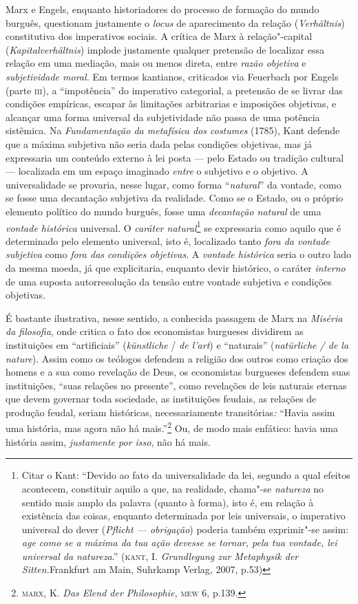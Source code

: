 Marx e Engels, enquanto historiadores do processo de formação do mundo
burguês, questionam justamente o \emph{locus} de aparecimento da relação
(\emph{Verhältnis}) constitutiva dos imperativos sociais. A crítica de
Marx à relação"-capital (\emph{Kapitalverhältnis}) implode justamente
qualquer pretensão de localizar essa relação em uma mediação, mais ou
menos direta, entre \emph{razão objetiva} e \emph{subjetividade moral.}
Em termos kantianos, criticados via Feuerbach por Engels (parte
\textsc{iii}), a ``impotência'' do imperativo categorial, a pretensão de
se livrar das condições empíricas, escapar às limitações arbitrarias e
imposições objetivas, e alcançar uma forma universal da subjetividade
não passa de uma potência sistêmica. Na \emph{Fundamentação da
metafísica dos costumes} (1785), Kant defende que a máxima subjetiva não
seria dada pelas condições objetivas, mas já expressaria um conteúdo
externo à lei posta --- pelo Estado ou tradição cultural --- localizada
em um espaço imaginado \emph{entre} o subjetivo e o objetivo. A
universalidade se provaria, nesse lugar, como forma ``\emph{natural}''
da vontade, como se fosse uma decantação subjetiva da realidade. Como se
o Estado, ou o próprio elemento político do mundo burguês, fosse uma
\emph{decantação natural} de uma \emph{vontade histórica} universal. O
\emph{caráter natural}\footnote{Citar o Kant: ``Devido ao fato da
  universalidade da lei, segundo a qual efeitos acontecem, constituir
  aquilo a que, na realidade, chama"-se \emph{natureza} no sentido mais
  amplo da palavra (quanto à forma), isto é, em relação à existência das
  coisas, enquanto determinada por leis universais, o imperativo
  universal do dever (\emph{Pflicht --- obrigação}) poderia também
  exprimir"-se assim: \emph{age como se a máxima da tua ação devesse se
  tornar, pela tua vontade, lei universal da natureza}.''
  (\textsc{kant}, I. \emph{Grundlegung zur Metaphysik der
  Sitten.}Frankfurt am Main, Suhrkamp Verlag, 2007, p.53)} se
expressaria como aquilo que é determinado pelo elemento universal, isto
é, localizado tanto \emph{fora da vontade subjetiva} como \emph{fora das
condições objetivas}. A \emph{vontade histórica} seria o outro lado da
mesma moeda, já que explicitaria, enquanto devir histórico, o caráter
\emph{interno} de uma suposta autorresolução da tensão entre vontade
subjetiva e condições objetivas.

É bastante ilustrativa, nesse sentido, a conhecida passagem de Marx na
\emph{Miséria da filosofia}, onde critica o fato dos economistas
burgueses dividirem as instituições em ``artificiais''
(\emph{künstliche} / \emph{de l'art}) e ``naturais'' (\emph{natürliche /
de la nature}). Assim como os teólogos defendem a religião dos outros
como criação dos homens e a sua como revelação de Deus, os economistas
burgueses defendem suas instituições, ``suas relações no presente'',
como revelações de leis naturais eternas que devem governar toda
sociedade, as instituições feudais, as relações de produção feudal,
seriam históricas, necessariamente transitórias\emph{:} ``Havia assim
uma história, mas agora não há mais.''\footnote{\textsc{marx}, K.
  \emph{Das Elend der Philosophie,} \textsc{mew} 6, p.139.} Ou, de modo
mais enfático: havia uma história assim, \emph{justamente por isso}, não
há mais.

